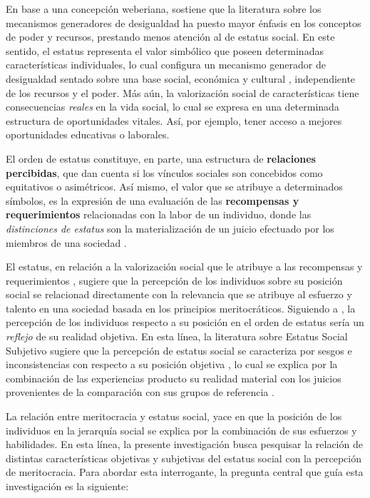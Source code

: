 \documentclass[12pt]{article}
\begin{document}
En base a una concepción weberiana, \citet{Ridgeway2014} sostiene que la literatura sobre los mecanismos generadores de desigualdad ha puesto mayor énfasis en los conceptos de poder y recursos, prestando menos atención al de estatus social. En este sentido, el estatus representa el valor simbólico que poseen determinadas características individuales, lo cual configura un mecanismo generador de desigualdad sentado sobre una base social, económica y cultural \citep{Jasso2001}, independiente de los recursos y el poder. Más aún, la valorización social de características tiene consecuencias \textit{reales} en la vida social, lo cual se expresa en una determinada estructura de oportunidades vitales. Así, por ejemplo, tener acceso a mejores oportunidades educativas o laborales.

El orden de estatus constituye, en parte, una estructura de \textbf{relaciones percibidas}, que dan cuenta si los vínculos sociales son concebidos como equitativos o asimétricos. Así mismo, el valor que se atribuye a determinados símbolos, es la expresión de una evaluación de las \textbf{recompensas y requerimientos} relacionadas con la labor de un individuo, donde las \textit{distinciones de estatus} son la materialización de un juicio efectuado por los miembros de una sociedad \citep{Chan2004, Ridgeway2014}. 


El estatus, en relación a la valorización social que le atribuye a las recompensas y requerimientos \citep{Chan2004}, sugiere que la percepción de los individuos sobre su posición social se relacionad directamente con la relevancia que se atribuye al esfuerzo y talento en una sociedad basada en los principios meritocráticos. Siguiendo a \citet{Smith1981}, la percepción de los individuos respecto a su posición en el orden de estatus sería un \textit{reflejo} de su realidad objetiva. En esta línea, la literatura sobre Estatus Social Subjetivo sugiere que la percepción de estatus social se caracteriza por sesgos e inconsistencias con respecto a su posición objetiva \citep{Evans2004,Lindemann2014}, lo cual se explica por la combinación de las experiencias producto su realidad material con los juicios provenientes de la comparación con sus grupos de referencia \citep{Evans1992,Evans2004,Evans2017}. 

La relación entre meritocracia y estatus social, yace en que la posición de los individuos en la jerarquía social se explica por la combinación de sus esfuerzos y habilidades. En esta línea, la presente investigación busca pesquisar la relación de distintas características objetivas y subjetivas del estatus social con la percepción de meritocracia. Para abordar esta interrogante, la pregunta central que guía esta investigación es la siguiente:
		
\end{document}
